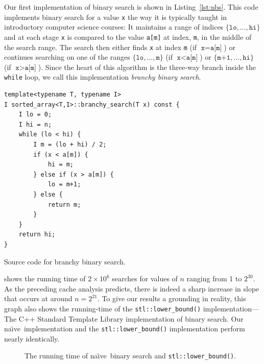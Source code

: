 \documentclass{patmorin}
\newcommand{\lstlabel}[1]{\label{lst:#1}}
\newcommand{\lstref}[1]{Listing~\ref{lst:#1}}
\newcommand{\naive}{na\"{\i}ve}
\begin{document}
Our first implementation of binary search is shown in
\lstref{nbs}. This code implements binary search for a
value \texttt{x} the way it is typically taught in
introductory computer science courses: It maintains a range of indices
$\{\texttt{lo},\ldots,\texttt{hi}\}$ and at each stage
\texttt{x} is compared to the value \texttt{a[m]} at
index, \texttt{m}, in the middle of the search range. The search
then either finds \texttt{x} at index \texttt{m} (if
$\texttt{x}=\texttt{a[m]}$) or continues searching on
one of the ranges $\{\texttt{lo},\ldots,\texttt{m}\}$
(if $\texttt{x}<\texttt{a[m]}$) or
$\{\texttt{m+1},\ldots,\texttt{hi}\}$ (if
$\texttt{x}>\texttt{a[m]}$).  Since the heart of this
algorithm is the three-way branch inside the \texttt{while}
loop, we call this implementation \emph{branchy binary search}.

\begin{listing}
\begin{verbatim}
template<typename T, typename I>
I sorted_array<T,I>::branchy_search(T x) const {
    I lo = 0;
    I hi = n;
    while (lo < hi) {
        I m = (lo + hi) / 2;
        if (x < a[m]) {
            hi = m;
        } else if (x > a[m]) {
            lo = m+1;
        } else {
            return m;
        }
    }
    return hi;
}
\end{verbatim}
\caption{Source code for branchy binary search.}
\lstlabel{nbs}
\end{listing}


 shows the running time of $2\times 10^6$ searches
for values of $n$ ranging from 1 to $2^{30}$. As the preceding cache analysis
predicts, there is indeed a sharp increase in slope that occurs at around
$n=2^{21}$.  To give our results a grounding in reality, this graph
also shows the running-time of the \texttt{stl::lower_bound()}
implementation---The C++ Standard Template Library implementation
of binary search.  Our \naive\ implementation and the
\texttt{stl::lower_bound()} implementation perform nearly
identically.


\begin{figure}
   \caption{The running time of \naive\ binary search and 
            \texttt{stl::lower_bound()}.}
\end{figure}
\end{document}
